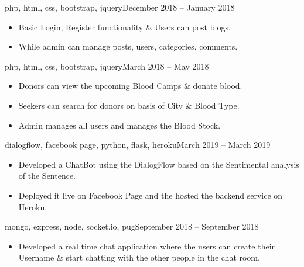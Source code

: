 \documentclass[10pt,a4paper]{altacv}
\begin{document}


{\MakeLowercase{PHP, HTML, CSS, BOOTSTRAP, jQUERY}}{December 2018 --  January 2018}{}\begin{itemize}
\item  Basic Login, Register functionality \& Users can post blogs. 
\item While admin can manage posts, users, categories, comments.
\end{itemize}
\medskip
\divider

{\MakeLowercase{PHP, HTML, CSS, BOOTSTRAP, jQUERY}}{March 2018 -- May 2018}{}
\begin{itemize}
\item  Donors can view the upcoming Blood Camps \& donate blood.
\item Seekers can search for donors on basis of City \& Blood Type.
\item Admin manages all users and manages the Blood Stock.
\end{itemize}
\medskip
\divider

{\MakeLowercase{DIALOGFLOW, FACEBOOK PAGE, PYTHON, FLASK, HEROKU}}{March 2019 -- March 2019}{}
\begin{itemize}
\item Developed a ChatBot using the DialogFlow based on the Sentimental analysis of the Sentence.
\item Deployed it live on Facebook Page and the hosted the backend service on Heroku.
\end{itemize}
\medskip
\divider



{\MakeLowercase{MONGO, EXPRESS, NODE, SOCKET.IO, PUG}}{September 2018 -- September 2018}{}
\begin{itemize}
\item Developed a real time chat application where the users can create their Username \& start chatting with the other people in the chat room.
\end{itemize}
\medskip
\divider
\end{document}
